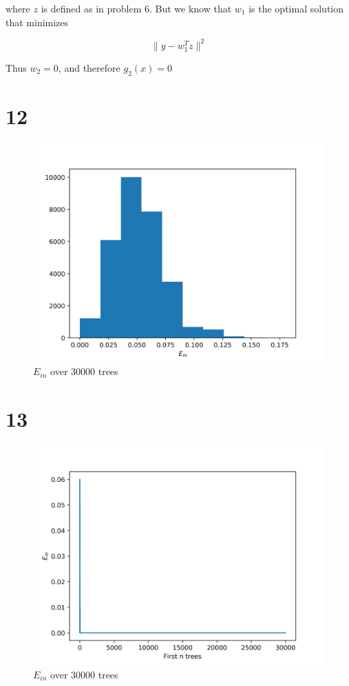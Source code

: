 \documentclass[fleqn,a4paper,12pt]{article}
\begin{document}
where $z$ is defined as in problem 6. But we know that $w_1$ is the optimal solution that minimizes 

\begin{equation*}
  \lVert y - w_1^T z \rVert^2
\end{equation*}

Thus $w_2 = 0$, and therefore $g_2(x) = 0$

\section*{12}

\begin{figure}[H]
\centering
\includegraphics[width=0.75\linewidth]{hist-ein.png}
\caption{$E_{in}$ over 30000 trees}
\label{fig:hist-ein}
\end{figure}

\section*{13}

\begin{figure}[H]
\centering
\includegraphics[width=0.75\linewidth]{tree-ein.png}
\caption{$E_{in}$ over 30000 trees}
\label{fig:tree-ein}
\end{figure}
\end{document}
